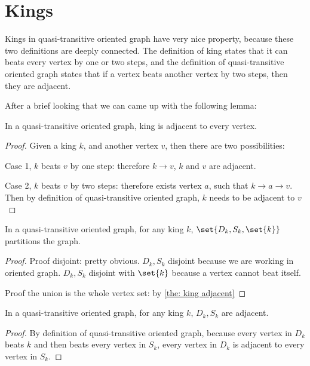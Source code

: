 \section{Kings}

Kings in quasi-transitive oriented graph have very nice property,
because these two definitions are deeply connected.
The definition of king states that it can beats every vertex
by one or two steps,
and the definition of quasi-transitive oriented graph states that
if a vertex beats another vertex by two steps,
then they are adjacent.

After a brief looking that we can came up with the following
lemma:

\begin{lemma}\label{the: king adjacent}
  In a quasi-transitive oriented graph,
  king is adjacent to every vertex.
\end{lemma}

\begin{proof}
  Given a king \(k\), and another vertex \(v\),
  then there are two possibilities:

  Case 1, \(k\) beats \(v\) by one step:
  therefore \(k \to v\), \(k\) and \(v\) are adjacent.

  Case 2, \(k\) beats \(v\) by two steps:
  therefore exists vertex \(a\), such that \(k \to a \to v\).
  Then by definition of quasi-transitive oriented graph,
  \(k\) needs to be adjacent to \(v\)
\end{proof}

\begin{lemma}
  In a quasi-transitive oriented graph,
  for any king \(k\), \(\set{D_k, S_k, \set{k}}\)
  partitions the graph.
\end{lemma}

\begin{proof}
  Proof disjoint: pretty obvious.
  \(D_k, S_k\) disjoint because we are working in oriented graph.
  \(D_k, S_k\) disjoint with \(\set{k}\)
  because a vertex cannot beat itself.

  Proof the union is the whole vertex set:
  by \cref{the: king adjacent}
\end{proof}

\begin{lemma}
  In a quasi-transitive oriented graph,
  for any king \(k\), \(D_k, S_k\) are adjacent.
\end{lemma}

\begin{proof}
  By definition of quasi-transitive oriented graph,
  because every vertex in \(D_k\) beats \(k\)
  and then beats every vertex in \(S_k\),
  every vertex in \(D_k\) is adjacent to every vertex in \(S_k\).
\end{proof}

